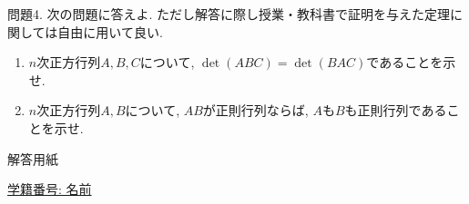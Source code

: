 \documentclass[dvipdfmx,a4paper,11pt]{article}
\theoremstyle{definition}
\begin{document}
  \vspace{5pt}
  問題4.
 次の問題に答えよ. ただし解答に際し授業・教科書で証明を与えた定理に関しては自由に用いて良い. 
 \begin{enumerate}
\renewcommand{\labelenumi}{(\arabic{enumi}).}
 \setlength{\parskip}{0cm} %
  \setlength{\itemsep}{0cm}
 \item $n$次正方行列$A, B, C$について, $\det(ABC) = \det(BAC)$であることを示せ.
 \item $n$次正方行列$A, B$について, $AB$が正則行列ならば, $A$も$B$も正則行列であることを示せ.
 \end{enumerate} 
 
 \newpage
 \begin{center}
 {\Large 解答用紙}
\end{center}


\begin{flushleft}
{ \large \underline{学籍番号: \hspace{4cm} 名前  \hspace{9cm}   }  }
\end{flushleft}


 
\end{document}
